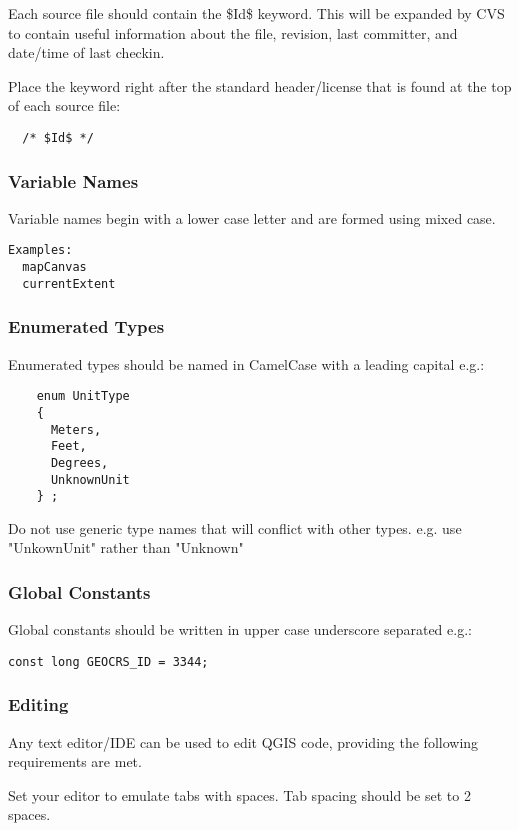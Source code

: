 Each source file should contain the \$Id\$ keyword. This will be expanded by CVS
to contain useful information about the file, revision, last committer, and
date/time of last checkin.

Place the keyword right after the standard header/license that is found at the
top of each source file:

\begin{verbatim}
  /* $Id$ */
\end{verbatim}

\subsubsection{Variable Names}
Variable names begin with a lower case letter and are formed using mixed case.

\begin{verbatim}
Examples:
  mapCanvas
  currentExtent
\end{verbatim}

\subsubsection{Enumerated Types}
Enumerated types should be named in CamelCase with a leading capital e.g.:

\begin{verbatim}
    enum UnitType
    {
      Meters,
      Feet,
      Degrees,
      UnknownUnit
    } ;
\end{verbatim}

Do not use generic type names that will conflict with other types. e.g. use
"UnkownUnit" rather than "Unknown"

\subsubsection{Global Constants}
Global constants should be written in upper case underscore separated e.g.:

\begin{verbatim}
const long GEOCRS_ID = 3344;
\end{verbatim}

\subsubsection{Editing}
Any text editor/IDE can be used to edit QGIS code, providing the following
requirements are met.

Set your editor to emulate tabs with spaces. Tab spacing should be set to 2
spaces.

